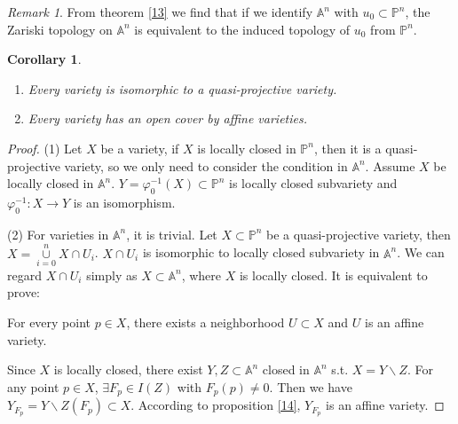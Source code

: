 \documentclass{amsart}
\theoremstyle{plain}
\newtheorem{corollary}{Corollary}
\theoremstyle{definition}
\theoremstyle{remark}
\newtheorem*{remark}{Remark}
\numberwithin{equation}{section}
\begin{document}
\begin{remark}
	From theorem \ref{13} we find that if we identify $ \mathbb{A}^n $ with $ u_0\subset \mathbb{P}^n $, the Zariski topology on $ \mathbb{A}^n $ is equivalent to the induced topology of $ u_0 $ from $ \mathbb{P}^n $.
\end{remark}
\begin{corollary}
	\begin{enumerate}
		\item Every variety is isomorphic to a quasi-projective variety.
		\item Every variety has an open cover by affine varieties.
	\end{enumerate}
\end{corollary}
\begin{proof}
	(1) Let $ X $ be a variety, if $ X $ is locally closed in $ \mathbb{P}^n $,
	then it is  a quasi-projective variety, so we only need to consider the condition in $ \mathbb{A}^n $. Assume $ X $ be locally closed in $ \mathbb{A}^n $. $ Y=\varphi ^{-1}_0 (X) \subset \mathbb{P}^n$ is locally closed subvariety and $ \varphi^{-1}_0 :X\to Y $ is an isomorphism.

	(2) For varieties in $ \mathbb{A}^n $, it is trivial. Let $ X\subset \mathbb{P}^n $ be a quasi-projective variety, then $ X=\mathop{\cup}\limits_{i=0}^{n}X\cap U_i $. $ X\cap U_i $ is isomorphic to locally closed subvariety in $ \mathbb{A}^n $. We can regard $ X\cap U_i $ simply as $ X \subset \mathbb{A}^n$, where $ X $ is locally closed. It is equivalent to prove:
	\begin{center}
		For every point $ p\in X $, there exists a neighborhood $ U\subset X $ and $ U $ is an affine variety.
	\end{center}
	Since $ X $ is locally closed, there exist $ Y,Z\subset \mathbb{A}^n $ closed in $ \mathbb{A}^n $ s.t. $ X=Y\backslash Z $. For any point $ p\in X $, $ \exists F_p\in I(Z) $ with $ F_p(p)\neq 0 $. Then we have $ Y_{F_p}=Y\backslash Z(F_p)\subset X $. According to proposition \ref{14}, $ Y_{F_p} $ is an affine variety.
\end{proof}
\end{document}
